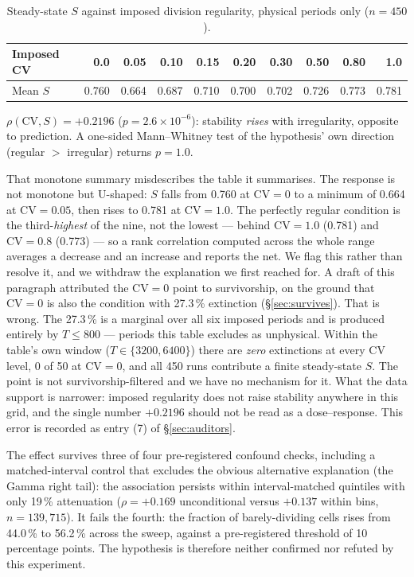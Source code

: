 \documentclass[11pt,letterpaper]{article}
\begin{document}
\begin{table}[H]
\centering
\caption{Steady-state $S$ against imposed division regularity, physical
periods only ($n = 450$).}
\begin{tabular}{lrrrrrrrrr}
\toprule
Imposed CV & 0.0 & 0.05 & 0.10 & 0.15 & 0.20 & 0.30 & 0.50 & 0.80 & 1.0 \\
\midrule
Mean $S$ & 0.760 & 0.664 & 0.687 & 0.710 & 0.700 & 0.702 & 0.726 & 0.773 & 0.781 \\
\bottomrule
\end{tabular}
\end{table}

$\rho(\mathrm{CV}, S) = +0.2196$ ($p = 2.6 \times 10^{-6}$): stability
\emph{rises} with irregularity, opposite to prediction. A one-sided
Mann--Whitney test of the hypothesis' own direction (regular
$>$ irregular) returns $p = 1.0$.

That monotone summary misdescribes the table it summarises. The
response is not monotone but U-shaped: $S$ falls from 0.760 at
$\mathrm{CV} = 0$ to a minimum of 0.664 at $\mathrm{CV} = 0.05$, then
rises to 0.781 at $\mathrm{CV} = 1.0$. The perfectly regular condition
is the third-\emph{highest} of the nine, not the lowest --- behind
$\mathrm{CV} = 1.0$ (0.781) and $\mathrm{CV} = 0.8$ (0.773) --- so a rank
correlation computed across the whole range averages a decrease and an
increase and reports the net. We flag this rather than resolve it, and we withdraw the explanation we
first reached for. A draft of this paragraph attributed the
$\mathrm{CV} = 0$ point to survivorship, on the ground that
$\mathrm{CV} = 0$ is also the condition with 27.3\,\% extinction
(\S\ref{sec:survives}). That is wrong. The 27.3\,\% is a marginal
over all six imposed periods and is produced entirely by
$T \leq 800$ --- periods this table excludes as unphysical. Within the
table's own window ($T \in \{3200, 6400\}$) there are \emph{zero}
extinctions at every $\mathrm{CV}$ level, 0 of 50 at $\mathrm{CV} = 0$,
and all 450 runs contribute a finite steady-state $S$. The point is not
survivorship-filtered and we have no mechanism for it. What the data
support is narrower: imposed regularity does not raise stability
anywhere in this grid, and the single number $+0.2196$ should not be
read as a dose--response. This error is recorded as entry (7) of
\S\ref{sec:auditors}.

The effect survives three of four pre-registered confound checks,
including a matched-interval control that excludes the obvious
alternative explanation (the Gamma right tail): the association persists
within interval-matched quintiles with only 19\,\% attenuation
($\rho = +0.169$ unconditional versus $+0.137$ within bins,
$n = 139{,}715$). It fails the fourth: the fraction of barely-dividing
cells rises from 44.0\,\% to 56.2\,\% across the sweep, against a
pre-registered threshold of 10 percentage points. The hypothesis is
therefore neither confirmed nor refuted by this experiment.
\end{document}

